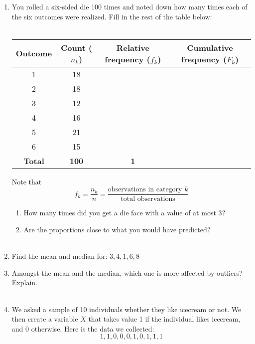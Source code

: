 \documentclass{./../handout}
\begin{document}
\thispagestyle{plain}
\begin{center}
\end{center}	

\begin{enumerate}
\item You rolled a six-sided die 100 times and noted down how many times each of the six outcomes were realized. Fill in the rest of the table below: \\~\\
\begin{tabular}{c|c|c|c}
Outcome & Count ($n_k$) & Relative frequency ($f_k$) & Cumulative frequency ($F_k$) \\
\hline
1 &  18 & & \\
\hline
2 & 18 & & \\
\hline
3 & 12 & & \\
\hline
4 & 16 & & \\
\hline
5 & 21 & & \\
\hline
6 & 15 & & \\
\hline
\textbf{Total} & \textbf{100} & \textbf{1} & \\
\hline
\end{tabular}
\vspace{0.5em}

Note that $$ f_k = \frac{n_k}{n} = \frac{\text{observations in category $k$}}{\text{total observations}} $$

\begin{enumerate}
	\item How many times did you get a die face with a value of at most 3? \\ 
	\item Are the proportions close to what you would have predicted? \\~\\
\end{enumerate}

\item Find the mean and median for: $ 3, 4, 1, 6, 8 $
\vspace{5em}
\item Amongst the mean and the median, which one is more affected by outliers? Explain. \\~\\
\item We asked a sample of 10 individuals whether they like icecream or not. We then create a variable $X$ that takes value 1 if the individual likes icecream, and 0 otherwise.  Here is the data we collected:
$$ 1, 1, 0, 0, 0, 1, 0, 1, 1, 1 $$


\end{enumerate}
\end{document}
